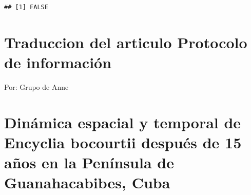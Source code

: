 \documentclass[
]{book}
\newenvironment{Shaded}{\begin{snugshade}}{\end{snugshade}}
\newcommand{\CommentTok}[1]{\textcolor[rgb]{0.56,0.35,0.01}{\textit{#1}}}
\newcommand{\ControlFlowTok}[1]{\textcolor[rgb]{0.13,0.29,0.53}{\textbf{#1}}}
\newcommand{\DecValTok}[1]{\textcolor[rgb]{0.00,0.00,0.81}{#1}}
\newcommand{\FunctionTok}[1]{\textcolor[rgb]{0.13,0.29,0.53}{\textbf{#1}}}
\newcommand{\NormalTok}[1]{#1}
\newcommand{\OtherTok}[1]{\textcolor[rgb]{0.56,0.35,0.01}{#1}}
\newcommand{\SpecialCharTok}[1]{\textcolor[rgb]{0.81,0.36,0.00}{\textbf{#1}}}
\theoremstyle{definition}
\theoremstyle{definition}
\theoremstyle{definition}
\theoremstyle{definition}
\theoremstyle{remark}
\begin{document}
\begin{Shaded}
\end{Shaded}

\begin{verbatim}
## [1] FALSE
\end{verbatim}

\begin{Shaded}
\end{Shaded}

\hypertarget{traduccion-del-articulo-protocolo-de-informaciuxf3n}{%
\chapter{Traduccion del articulo Protocolo de información}\label{traduccion-del-articulo-protocolo-de-informaciuxf3n}}

Por: Grupo de Anne

\hypertarget{dinuxe1mica-espacial-y-temporal-de-encyclia-bocourtii-despuuxe9s-de-15-auxf1os-en-la-penuxednsula-de-guanahacabibes-cuba}{%
\chapter{Dinámica espacial y temporal de Encyclia bocourtii después de 15 años en la Península de Guanahacabibes, Cuba}\label{dinuxe1mica-espacial-y-temporal-de-encyclia-bocourtii-despuuxe9s-de-15-auxf1os-en-la-penuxednsula-de-guanahacabibes-cuba}}
\end{document}
